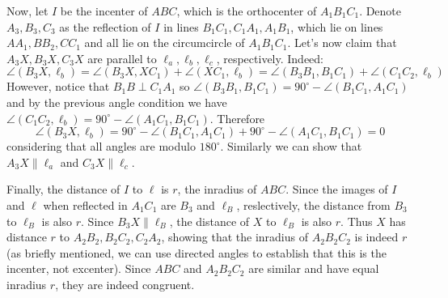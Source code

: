 \documentclass[11pt,a4paper]{article}
\begin{document}
\begin{enumerate}
	Now, let $I$ be the incenter of $ABC$, which is the orthocenter of $A_1B_1C_1$. Denote $A_3, B_3, C_3$ as the reflection of $I$ in lines $B_1C_1, C_1A_1, A_1B_1$, which lie on lines $AA_1, BB_2, CC_1$ and all lie on the circumcircle of $A_1B_1C_1$.
	Let's now claim that $A_3X, B_3X, C_3X$ are parallel to $\ell_a, \ell_b, \ell_c$, respectively. Indeed: 
	\[
	\angle(B_3X, \ell_b) = \angle(B_3X, XC_1) + \angle(XC_1, \ell_b) = \angle(B_3B_1, B_1C_1) + \angle(C_1C_2, \ell_b)
	\]
	However, notice that $B_1B\perp C_1A_1$ so $\angle(B_3B_1, B_1C_1)=90^{\circ} - \angle(B_1C_1, A_1C_1)$ and by the previous angle condition we have $\angle(C_1C_2, \ell_b) = 90^{\circ} - \angle(A_1C_1, B_1C_1)$. Therefore 
	\[\angle(B_3X, \ell_b)
	=90^{\circ} - \angle(B_1C_1, A_1C_1)+90^{\circ} - \angle(A_1C_1, B_1C_1)= 0
	\]
	considering that all angles are modulo $180^{\circ}$. Similarly we can show that $A_3X\parallel \ell_a$ and $C_3X\parallel \ell_c$. 
	
	Finally, the distance of $I$ to $\ell$ is $r$, the inradius of $ABC$. Since the images of $I$ and $\ell$ when reflected in $A_1C_1$ are $B_3$ and $\ell_B$, reslectively, the distance from $B_3$ to $\ell_B$ is also $r$. Since $B_3X\parallel \ell_B$, the distance of $X$ to $\ell_B$ is also $r$. Thus $X$ has distance $r$ to $A_2B_2, B_2C_2, C_2A_2$, showing that the inradius of $A_2B_2C_2$ is indeed $r$ (as briefly mentioned, we can use directed angles to establish that this is the incenter, not excenter). Since $ABC$ and $A_2B_2C_2$ are similar and have equal inradius $r$, they are indeed congruent. 
	
\end{enumerate}
\end{document}

